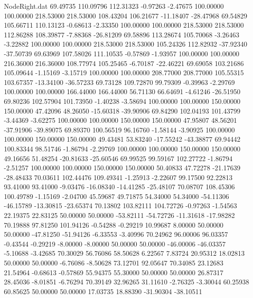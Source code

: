 \begin{filecontents}{NodeRight.dat}
  69.49735  110.09796  112.31323    -0.97263   -2.47675  100.00000  100.00000  218.53000  218.53000  108.43204  106.21677  -11.18407  -28.47968
  69.54829  105.66711  110.13123    -0.68613   -2.33350  100.00000  100.00000  218.53000  218.53000  112.86288  108.39877   -7.88368  -26.81209
  69.58896  113.28674  105.70068    -3.26463   -3.22882  100.00000  100.00000  218.53000  218.53000  105.24326  112.82932  -37.92340  -37.50739
  69.63969  107.58026  111.10535    -0.57869   -1.93957  100.00000  100.00000  216.36000  216.36000  108.77974  105.25465   -6.70187  -22.46221
  69.69058  103.21686  105.09644    -1.15169   -3.15719  100.00000  100.00000  208.77000  208.77000  105.55315  103.67357  -13.34100  -36.57233
  69.73128  109.72870   99.79309    -0.39963   -2.29769  100.00000  100.00000  166.44000  166.44000   56.71130   66.64691   -4.61246  -26.51950
  69.80236  102.57904  101.73950    -1.40238   -3.58694  100.00000  100.00000  150.00000  150.00000   47.42096   48.26050  -15.60318  -39.90906
  69.84290  102.04193  101.43799    -3.44369   -3.62275  100.00000  100.00000  150.00000  150.00000   47.95807   48.56201  -37.91906  -39.89075
  69.89370  100.56519   96.16760    -1.58144   -3.90925  100.00000  100.00000  150.00000  150.00000   49.43481   53.83240  -17.55242  -43.38877
  69.94442  100.83344   98.51746    -1.86794   -2.29769  100.00000  100.00000  150.00000  150.00000   49.16656   51.48254  -20.81633  -25.60546
  69.99525   99.59167  102.27722    -1.86794   -2.51257  100.00000  100.00000  150.00000  150.00000   50.40833   47.72278  -21.17639  -28.48433
  70.03611  102.44476  109.49341    -1.25913   -2.22607   99.17500   92.22813   93.41000   93.41000   -9.03476  -16.08340  -14.41285  -25.48107
  70.08707  108.45306  100.49789    -1.15169   -2.04700   45.59687   49.71875   54.34000   54.34000  -54.11306  -46.15789  -13.30815  -23.65374
  70.13802  103.82111  104.72726    -0.97263   -1.54563   22.19375   22.83125   50.00000   50.00000  -53.82111  -54.72726  -11.31618  -17.98282
  70.19888   97.81250  101.94126    -0.54288   -0.29219   10.99687    8.00000   50.00000   50.00000  -47.81250  -51.94126   -6.33553   -3.40996
  70.24962   96.00006   96.03357    -0.43544   -0.29219   -8.00000   -8.00000   50.00000   50.00000  -46.00006  -46.03357   -5.10688   -3.42685
  70.30029   56.76086   58.50628     6.22567    7.83724   20.95312   18.02813   50.00000   50.00000   -6.76086   -8.50628   73.12701   92.05647
  70.34085   23.12683   21.54964    -0.68613   -0.57869   55.94375   55.30000   50.00000   50.00000   26.87317   28.45036   -8.01851   -6.76294
  70.39149   32.96265   31.11610    -2.76325   -3.30044   60.25938   60.85625   50.00000   50.00000   17.03735   18.88390  -31.90304  -38.10511

\end{filecontents}
